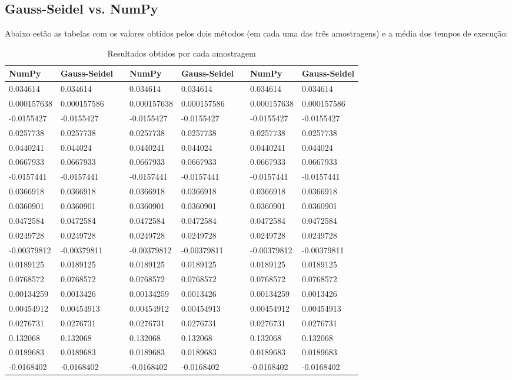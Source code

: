 \documentclass[12pt,A4]{report}
\begin{document}
\subsection{Gauss-Seidel vs. NumPy}
Abaixo estão as tabelas com os valores obtidos pelos dois métodos (em cada uma das três amostragens) e a média dos tempos de execução:
\begin{table}[htp]
\centering
\begin{tabular}{llllllll}
 NumPy & Gauss-Seidel     &  & NumPy       & Gauss-Seidel&  &NumPy        & Gauss-Seidel \\
  \hline\hline
0.034614    & 0.034614    &  & 0.034614    & 0.034614    &  & 0.034614    & 0.034614    \\
0.000157638 & 0.000157586 &  & 0.000157638 & 0.000157586 &  & 0.000157638 & 0.000157586 \\
-0.0155427  & -0.0155427  &  & -0.0155427  & -0.0155427  &  & -0.0155427  & -0.0155427  \\
0.0257738   & 0.0257738   &  & 0.0257738   & 0.0257738   &  & 0.0257738   & 0.0257738   \\
0.0440241   & 0.044024    &  & 0.0440241   & 0.044024    &  & 0.0440241   & 0.044024    \\
0.0667933   & 0.0667933   &  & 0.0667933   & 0.0667933   &  & 0.0667933   & 0.0667933   \\
-0.0157441  & -0.0157441  &  & -0.0157441  & -0.0157441  &  & -0.0157441  & -0.0157441  \\
0.0366918   & 0.0366918   &  & 0.0366918   & 0.0366918   &  & 0.0366918   & 0.0366918   \\
0.0360901   & 0.0360901   &  & 0.0360901   & 0.0360901   &  & 0.0360901   & 0.0360901   \\
0.0472584   & 0.0472584   &  & 0.0472584   & 0.0472584   &  & 0.0472584   & 0.0472584   \\
0.0249728   & 0.0249728   &  & 0.0249728   & 0.0249728   &  & 0.0249728   & 0.0249728   \\
-0.00379812 & -0.00379811 &  & -0.00379812 & -0.00379811 &  & -0.00379812 & -0.00379811 \\
0.0189125   & 0.0189125   &  & 0.0189125   & 0.0189125   &  & 0.0189125   & 0.0189125   \\
0.0768572   & 0.0768572   &  & 0.0768572   & 0.0768572   &  & 0.0768572   & 0.0768572   \\
0.00134259  & 0.0013426   &  & 0.00134259  & 0.0013426   &  & 0.00134259  & 0.0013426   \\
0.00454912  & 0.00454913  &  & 0.00454912  & 0.00454913  &  & 0.00454912  & 0.00454913  \\
0.0276731   & 0.0276731   &  & 0.0276731   & 0.0276731   &  & 0.0276731   & 0.0276731   \\
0.132068    & 0.132068    &  & 0.132068    & 0.132068    &  & 0.132068    & 0.132068    \\
0.0189683   & 0.0189683   &  & 0.0189683   & 0.0189683   &  & 0.0189683   & 0.0189683   \\
-0.0168402  & -0.0168402  &  & -0.0168402  & -0.0168402  &  & -0.0168402  & -0.0168402 
\end{tabular}
\caption{Resultados obtidos por cada amostragem}
\end{table}
\end{document}
